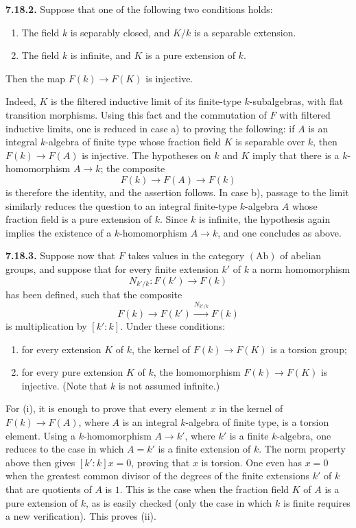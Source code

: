 \textbf{7.18.2.}
Suppose that one of the following two conditions holds:
\begin{enumerate}[label=\alph*)]
\item The field $k$ is separably closed, and $K/k$ is a separable extension.
\item The field $k$ is infinite, and $K$ is a pure extension of $k$.
\end{enumerate}
Then the map $F(k)\to F(K)$ is injective.

Indeed, $K$ is the filtered inductive limit of its finite-type
$k$-subalgebras, with flat transition morphisms. Using this fact and the
commutation of $F$ with filtered inductive limits, one is reduced in case
a) to proving the following: if $A$ is an integral $k$-algebra of finite
type whose fraction field $K$ is separable over $k$, then
$F(k)\to F(A)$ is injective. The hypotheses on $k$ and $K$ imply that there
is a $k$-homomorphism $A\to k$; the composite
\[
F(k)\longrightarrow F(A)\longrightarrow F(k)
\]
is therefore the identity, and the assertion follows. In case b), passage
to the limit similarly reduces the question to an integral finite-type
$k$-algebra $A$ whose fraction field is a pure extension of $k$. Since $k$
is infinite, the hypothesis again implies the existence of a
$k$-homomorphism $A\to k$, and one concludes as above.

\textbf{7.18.3.}
Suppose now that $F$ takes values in the category $(\mathrm{Ab})$ of
abelian groups, and suppose that for every finite extension $k'$ of $k$ a
norm homomorphism
\[
N_{k'/k}:F(k')\longrightarrow F(k)
\]
has been defined, such that the composite
\[
F(k)\longrightarrow F(k')\xrightarrow{N_{k'/k}}F(k)
\]
is multiplication by $[k':k]$. Under these conditions:
\begin{enumerate}[label=(\roman*)]
\item for every extension $K$ of $k$, the kernel of
  $F(k)\to F(K)$ is a torsion group;
\item for every pure extension $K$ of $k$, the homomorphism
  $F(k)\to F(K)$ is injective. (Note that $k$ is not assumed infinite.)
\end{enumerate}

For (i), it is enough to prove that every element $x$ in the kernel of
$F(k)\to F(A)$, where $A$ is an integral $k$-algebra of finite type, is a
torsion element. Using a $k$-homomorphism $A\to k'$, where $k'$ is a finite
$k$-algebra, one reduces to the case in which $A=k'$ is a finite extension
of $k$. The norm property above then gives $[k':k]x=0$, proving that $x$ is
torsion. One even has $x=0$ when the greatest common divisor of the degrees
of the finite extensions $k'$ of $k$ that are quotients of $A$ is $1$. This
is the case when the fraction field $K$ of $A$ is a pure extension of $k$,
as is easily checked (only the case in which $k$ is finite requires a new
verification). This proves (ii).

